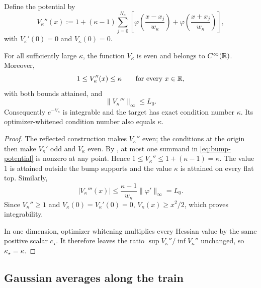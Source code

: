 Define the potential by
\begin{equation}
\label{eq:bump-potential}
    V_\kappa''(x)
    :=1+(\kappa-1)
    \sum_{j=0}^{N_\kappa}
    \left[
        \varphi\left(\frac{x-x_j}{w_\kappa}\right)
        +
        \varphi\left(\frac{x+x_j}{w_\kappa}\right)
    \right],
\end{equation}
with $V_\kappa'(0)=0$ and $V_\kappa(0)=0$.

\begin{lemma}
\label{lem:bump-potential-regularity}
For all sufficiently large $\kappa$, the function $V_\kappa$ is even and belongs to
$C^\infty(\mathbb{R})$.  Moreover,
\begin{equation}
\label{eq:bump-curvature-bounds}
    1\leq V_\kappa''(x)\leq\kappa
    \qquad\text{for every }x\in\mathbb{R},
\end{equation}
with both bounds attained, and
\begin{equation}
\label{eq:bump-Hess-Lip}
    \|V_\kappa'''\|_\infty\leq L_0.
\end{equation}
Consequently $e^{-V_\kappa}$ is integrable and the target has exact condition number
$\kappa$.  Its optimizer-whitened condition number also equals $\kappa$.
\end{lemma}

\begin{proof}
The reflected construction makes $V_\kappa''$ even; the conditions at the origin then make
$V_\kappa'$ odd and $V_\kappa$ even.  By , at most one summand in
\eqref{eq:bump-potential} is nonzero at any point.  Hence
$1\leq V_\kappa''\leq1+(\kappa-1)=\kappa$.  The value $1$ is attained outside the bump
supports and the value $\kappa$ is attained on every flat top.  Similarly,
\[
    |V_\kappa'''(x)|
    \leq
    \frac{\kappa-1}{w_\kappa}\|\varphi'\|_\infty
    =L_0.
\]
Since $V_\kappa''\geq1$ and $V_\kappa(0)=V_\kappa'(0)=0$,
$V_\kappa(x)\geq x^2/2$, which proves integrability.

In one dimension, optimizer whitening multiplies every Hessian value by the same positive
scalar $c_\star$.  It therefore leaves the ratio
$\sup V_\kappa''/\inf V_\kappa''$ unchanged, so $\kappa_\star=\kappa$.
\end{proof}

\subsection{Gaussian averages along the train}

